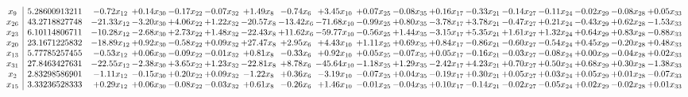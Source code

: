 \documentclass[9pt]{article}
\begin{document}
 \[\begin{array}{c| c c@{\hskip 2pt} c@{\hskip 2pt} c@{\hskip 2pt} c@{\hskip 2pt} c@{\hskip 2pt} c@{\hskip 2pt} c@{\hskip 2pt} c@{\hskip 2pt} c@{\hskip 2pt} c@{\hskip 2pt} c@{\hskip 2pt} c@{\hskip 2pt} c@{\hskip 2pt} c@{\hskip 2pt} c@{\hskip 2pt} c@{\hskip 2pt} }
 x_{9}   &  5.28600913211 & -0.72 x_{12} & +  0.14 x_{30} & -0.17 x_{22} & -0.07 x_{32} & +  1.49 x_{8} & -0.74 x_{6} & +  3.45 x_{10} & +  0.07 x_{25} & -0.08 x_{35} & +  0.16 x_{17} & -0.33 x_{21} & -0.14 x_{27} & -0.11 x_{24} & -0.02 x_{29} & -0.08 x_{28} & +  0.05 x_{33}\\
 x_{26}   &  43.2718827748 & -21.33 x_{12} & -3.20 x_{30} & +  4.06 x_{22} & +  1.22 x_{32} & -20.57 x_{8} & -13.42 x_{6} & -71.68 x_{10} & -0.99 x_{25} & +  0.80 x_{35} & -3.78 x_{17} & +  3.78 x_{21} & -0.47 x_{27} & +  0.21 x_{24} & -0.43 x_{29} & +  0.62 x_{28} & -1.53 x_{33}\\
 x_{23}   &  6.10114806711 & -10.28 x_{12} & -2.68 x_{30} & +  2.73 x_{22} & +  1.48 x_{32} & -22.43 x_{8} & + 11.62 x_{6} & -59.77 x_{10} & -0.56 x_{25} & +  1.44 x_{35} & -3.15 x_{17} & +  5.35 x_{21} & +  1.61 x_{27} & +  1.32 x_{24} & +  0.64 x_{29} & +  0.83 x_{28} & -0.88 x_{33}\\
 x_{20}   &  23.1671225832 & -18.89 x_{12} & +  0.92 x_{30} & -0.58 x_{22} & +  0.09 x_{32} & + 27.47 x_{8} & +  2.95 x_{6} & +  4.43 x_{10} & +  1.11 x_{25} & +  0.69 x_{35} & +  0.84 x_{17} & -0.86 x_{21} & -0.60 x_{27} & -0.54 x_{24} & +  0.45 x_{29} & -0.20 x_{28} & +  0.48 x_{33}\\
 x_{13}   &  5.77785257455 & -0.53 x_{12} & +  0.06 x_{30} & -0.09 x_{22} & -0.01 x_{32} & +  0.81 x_{8} & -0.33 x_{6} & +  0.92 x_{10} & +  0.05 x_{25} & -0.07 x_{35} & +  0.05 x_{17} & -0.16 x_{21} & -0.03 x_{27} & -0.08 x_{24} & +  0.00 x_{29} & -0.04 x_{28} & +  0.02 x_{33}\\
 x_{31}   &  27.8463427631 & -22.55 x_{12} & -2.38 x_{30} & +  3.65 x_{22} & +  1.23 x_{32} & -22.81 x_{8} & +  8.78 x_{6} & -45.64 x_{10} & -1.18 x_{25} & +  1.29 x_{35} & -2.42 x_{17} & +  4.23 x_{21} & +  0.70 x_{27} & +  0.50 x_{24} & +  0.68 x_{29} & +  0.30 x_{28} & -1.38 x_{33}\\
 x_{2}   &  2.83298586901 & -1.11 x_{12} & -0.15 x_{30} & +  0.20 x_{22} & +  0.09 x_{32} & -1.22 x_{8} & +  0.36 x_{6} & -3.19 x_{10} & -0.07 x_{25} & +  0.04 x_{35} & -0.19 x_{17} & +  0.30 x_{21} & +  0.05 x_{27} & +  0.03 x_{24} & +  0.05 x_{29} & +  0.01 x_{28} & -0.07 x_{33}\\
 x_{15}   &  3.33236528333 & +  0.29 x_{12} & +  0.06 x_{30} & -0.08 x_{22} & -0.03 x_{32} & +  0.61 x_{8} & -0.26 x_{6} & +  1.46 x_{10} & -0.01 x_{25} & -0.04 x_{35} & +  0.10 x_{17} & -0.14 x_{21} & -0.02 x_{27} & -0.05 x_{24} & +  0.02 x_{29} & -0.02 x_{28} & +  0.01 x_{33}\\

\end{array}\]
\end{document}

